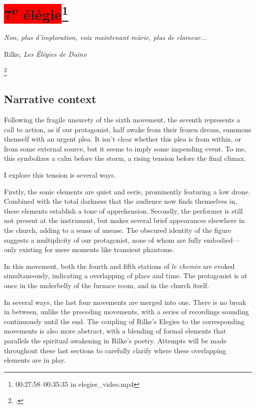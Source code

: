 \documentclass[12pt,twoside,maitrise]{dms_ks}
\theoremstyle{definition}
\begin{document}
{\section{\colorbox{red}{7\textsuperscript{e} élégie}\footnote{00:27:58--00:35:35 in elegies\_video.mp4}}

\epigraph{\textit{Non, plus d’imploration, voix maintenant mûrie, plus de clameur...}}{Rilke, \textit{Les Élégies de Duino}\protect\footnotemark}

\footcitetext[63]{rilke_egies_1986}

\subsection{Narrative context}

Following the fragile unsurety of the sixth movement, the seventh represents a call to action, as if our protagonist, half awake from their frozen dream, summons themself with an urgent plea. 
It isn’t clear whether this plea is from within, or from some external source, but it seems to imply some impending event. 
To me, this symbolizes a calm before the storm, a rising tension before the final climax. 

I explore this tension is several ways. 

Firstly, the sonic elements are quiet and eerie, prominently featuring a low drone. 
Combined with the total darkness that the audience now finds themselves in, these elements establish a tone of apprehension.
Secondly, the performer is still not present at the instrument, but makes several brief appearances elsewhere in the church, adding to a sense of unease. 
The obscured identity of the figure suggests a multiplicity of our protagonist, none of whom are fully embodied---only existing for mere moments like transient phantoms.

In this movement, both the fourth and fifth stations of \textit{le chemin} are evoked simultaneously, indicating a overlapping of place and time. 
The protagonist is at once in the underbelly of the furnace room, and in the church itself. 

In several ways, the last four movements are merged into one. 
There is no break in between, unlike the preceding movements, with a series of recordings sounding continuously until the end. 
The coupling of Rilke's Elegies to the corresponding movements is also more abstract, with a blending of formal elements that parallels the spiritual awakening in Rilke’s poetry. 
Attempts will be made throughout these last sections to carefully clarify where these overlapping elements are in play.

}
\end{document}
